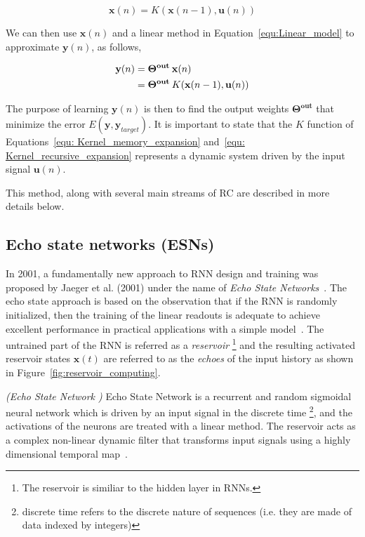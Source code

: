 \documentclass{WitsPhysicsReport}
\begin{document}
\begin{equation}
\mathbf{x}(n) = K(\mathbf{x}(n-1),\mathbf{u}(n))
\label{equ: Kernel_recursive_expansion}
\end{equation}

We can then use $\mathbf{x}(n)$ and a linear method in Equation~\ref{equ:Linear_model} to approximate $\mathbf{y}(n)$, as follows,

\begin{equation}
\begin{aligned}
\mathbf{y}(n) &= \mathbf{{\Theta}^{out}} \hspace{0.2em} \mathbf{x}(n)\\
&=\mathbf{{\Theta}^{out}}\hspace{0.2em} K(\mathbf{x}(n-1),\mathbf{u}(n))
\label{equ:Kernel_expansion_readout}
\end{aligned}
\end{equation}


The purpose of learning  $\mathbf{y}(n)$  is then to find the output weights $\mathbf{{\Theta}^{out}}$ that minimize the error $E (\mathbf{y}, \mathbf{y}_{target})$. It is important to state that the $K$ function of Equations~\ref{equ: Kernel_memory_expansion} and~\ref{equ: Kernel_recursive_expansion} represents a dynamic system driven by the input signal $\mathbf{u}(n)$.

This method, along with several main streams of RC are described in more details below.


\subsection{Echo state networks (ESNs)}
\label{sec:Echo_State_Networks}


In 2001, a fundamentally new approach to RNN design and training was proposed by Jaeger et al. (2001) under the name of \textit{Echo State Networks}~\cite{jaeger2001echo}. The echo state approach is based on the observation that if the RNN is randomly initialized, then the training of the linear readouts is adequate to achieve excellent performance in practical applications with a simple model~\cite{lukovsevivcius2009reservoir}. The untrained part of the RNN is referred as a \textit{reservoir} \footnote{The reservoir is similiar to the hidden layer in RNNs.} and the resulting activated reservoir states $\mathbf{x}(t)$ are referred to as the \textit{echoes} of the input history as shown in Figure~\ref{fig:reservoir_computing}.

\begin{definition}
\emph{(Echo State Network )}
Echo State Network is a recurrent and random sigmoidal neural network which is driven by an input signal in the discrete time \footnote{discrete time refers to the discrete nature of sequences (i.e. they are made of data indexed by integers)}, and the activations of the neurons are treated with a linear method. The reservoir acts as a complex non-linear dynamic filter that transforms input signals using a highly dimensional temporal map~\cite{jaeger2001echo}.
\label{def:Echo_State_Network}
\end{definition}
\end{document}
